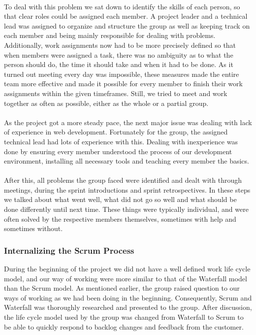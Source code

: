\paragraph{} To deal with this problem we sat down to identify the skills of each person, so that clear roles could be assigned each member. A project leader and a technical lead was assigned to organize and structure the group as well as keeping track on each member and being mainly responsible for dealing with problems. Additionally, work assignments now had to be more precisely defined so that when members were assigned a task, there was no ambiguity as to what the person should do, the time it should take and when it had to be done. As it turned out meeting every day was impossible, these measures made the entire team more effective and made it possible for every member to finish their work assignments within the given timeframes. Still, we tried to meet and work together as often as possible, either as the whole or a partial group.
\paragraph{} As the project got a more steady pace, the next major issue was dealing with lack of experience in web development. Fortunately for the group, the assigned technical lead had lots of experience with this. Dealing with inexperience was done by ensuring every member understood the process of our development environment, installing all necessary tools and teaching every member the basics. 
\paragraph{} After this, all problems the group faced were identified and dealt with through meetings, during the sprint introductions and sprint retrospectives. In these steps we talked about what went well, what did not go so well and what should be done differently until next time. These things were typically individual, and were often solved by the respective members themselves, sometimes with help and sometimes without. 
\subsubsection{Internalizing the Scrum Process} During the beginning of the project we did not have a well defined work life cycle model, and our way of working were more similar to that of the Waterfall model than the Scrum model. As mentioned earlier, the group raised question to our ways of working as we had been doing in the beginning. Consequently, Scrum and Waterfall was thoroughly researched and presented to the group. After discussion, the life cycle model used by the group was changed from Waterfall to Scrum to be able to quickly respond to backlog changes and feedback from the customer. 
